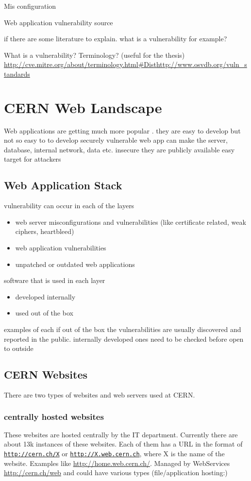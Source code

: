 Mis configuration

Web application
vulnerability source

if there are some literature to explain. what is a vulnerability for example?

What is a vulnerability? Terminology? (useful for the thesis) 
\url{http://cve.mitre.org/about/terminology.html#Dist}\url{http://www.osvdb.org/vuln_standards}

\section{CERN Web Landscape}
Web applications are getting much more popular . they are easy to develop but not so easy to to develop securely
vulnerable web app can make the server, database, internal network, data etc. insecure
they are publicly available
easy target for attackers

\subsection{Web Application Stack}
vulnerability can occur in each of the layers
\begin{itemize}
\item web server misconfigurations and vulnerabilities (like certificate related, weak ciphers, heartbleed) 
\item web application vulnerabilities
\item unpatched or outdated web applications
\end{itemize}


software that is used in each layer
\begin{itemize}
\item developed internally
\item used out of the box
\end{itemize}
examples of each
if out of the box the vulnerabilities are usually discovered and reported in the public.
internally developed ones need to be checked before open to outside

\subsection{CERN Websites}
There are two types of websites and web servers used at CERN.
\subsubsection{centrally hosted websites}
These websites are hosted centrally by the IT department. Currently there are about 13k instances of these websites. Each of them has a URL in the format of \texttt{\url{http://cern.ch/X}} or \texttt{\url{http://X.web.cern.ch}}, where X is the name of the website. Examples like \url{http://home.web.cern.ch/}. Managed by WebServices \url{http://cern.ch/web} and could have various types 
(file/application hosting:)

